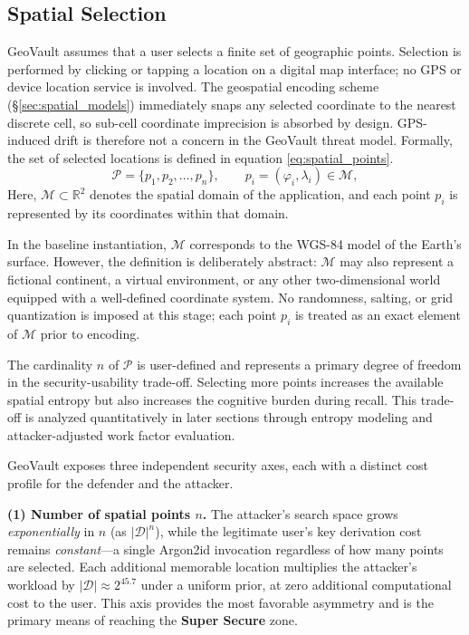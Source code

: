 \documentclass[journal,article,accept,pdftex,moreauthors]{Definitions/mdpi}
\begin{document}
\subsection{Spatial Selection}

GeoVault assumes that a user selects a finite set of geographic points. Selection is performed by clicking or tapping a location on a digital map interface; no GPS or device location service is involved. The geospatial encoding scheme (\S\ref{sec:spatial_models}) immediately snaps any selected coordinate to the nearest discrete cell, so sub-cell coordinate imprecision is absorbed by design. GPS-induced drift is therefore not a concern in the GeoVault threat model. Formally, the set of selected locations is defined in equation \ref{eq:spatial_points}.
\begin{equation}
    \mathcal{P} = \{p_1, p_2, \dots, p_n\}, \qquad p_i = (\varphi_i, \lambda_i) \in \mathcal{M},
    \label{eq:spatial_points}
\end{equation}
Here, $\mathcal{M} \subset \mathbb{R}^2$ denotes the spatial domain of the application, and each point $p_i$ is represented by its coordinates within that domain.

In the baseline instantiation, $\mathcal{M}$ corresponds to the WGS-84 model of the Earth’s surface. However, the definition is deliberately abstract: $\mathcal{M}$ may also represent a fictional continent, a virtual environment, or any other two-dimensional world equipped with a well-defined coordinate system. No randomness, salting, or grid quantization is imposed at this stage; each point $p_i$ is treated as an exact element of $\mathcal{M}$ prior to encoding.

The cardinality $n$ of $\mathcal{P}$ is user-defined and represents a primary degree of freedom in the security-usability trade-off. Selecting more points increases the available spatial entropy but also increases the cognitive burden during recall. This trade-off is analyzed quantitatively in later sections through entropy modeling and attacker-adjusted work factor evaluation.

GeoVault exposes three independent security axes, each with a distinct cost profile for the defender and the attacker.

\textbf{(1) Number of spatial points $n$.} The attacker's search space grows \emph{exponentially} in $n$ (as $|\mathcal{D}|^n$), while the legitimate user's key derivation cost remains \emph{constant}---a single Argon2id invocation regardless of how many points are selected. Each additional memorable location multiplies the attacker's workload by $|\mathcal{D}| \approx 2^{45.7}$ under a uniform prior, at zero additional computational cost to the user. This axis provides the most favorable asymmetry and is the primary means of reaching the \textbf{Super Secure} zone.
\end{document}
